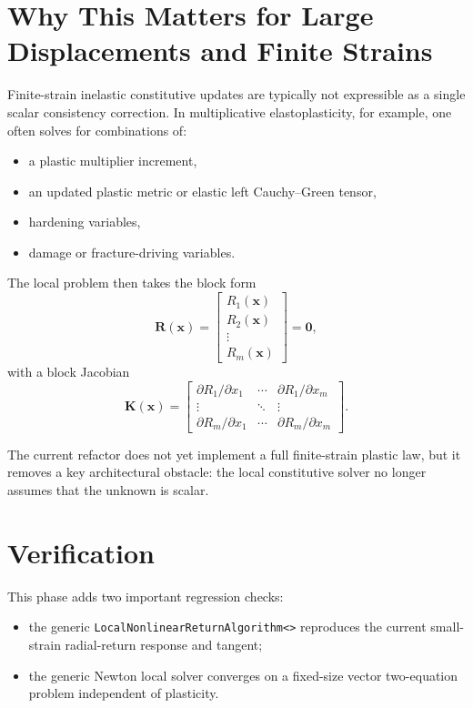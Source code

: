 \section{Why This Matters for Large Displacements and Finite Strains}

Finite-strain inelastic constitutive updates are typically not expressible as a
single scalar consistency correction.  In multiplicative elastoplasticity, for
example, one often solves for combinations of:
\begin{itemize}
  \item a plastic multiplier increment,
  \item an updated plastic metric or elastic left Cauchy--Green tensor,
  \item hardening variables,
  \item damage or fracture-driving variables.
\end{itemize}

The local problem then takes the block form
\[
  \mathbf{R}(\mathbf{x}) =
  \begin{bmatrix}
    R_1(\mathbf{x}) \\
    R_2(\mathbf{x}) \\
    \vdots \\
    R_m(\mathbf{x})
  \end{bmatrix}
  = \mathbf{0},
\]
with a block Jacobian
\[
  \mathbf{K}(\mathbf{x}) =
  \begin{bmatrix}
    \partial R_1/\partial x_1 & \cdots & \partial R_1/\partial x_m \\
    \vdots & \ddots & \vdots \\
    \partial R_m/\partial x_1 & \cdots & \partial R_m/\partial x_m
  \end{bmatrix}.
\]

The current refactor does not yet implement a full finite-strain plastic law,
but it removes a key architectural obstacle: the local constitutive solver no
longer assumes that the unknown is scalar.

\section{Verification}

This phase adds two important regression checks:
\begin{itemize}
  \item the generic
        \texttt{LocalNonlinearReturnAlgorithm<>}
        reproduces the current small-strain radial-return response and tangent;
  \item the generic Newton local solver converges on a fixed-size vector
        two-equation problem independent of plasticity.
\end{itemize}

